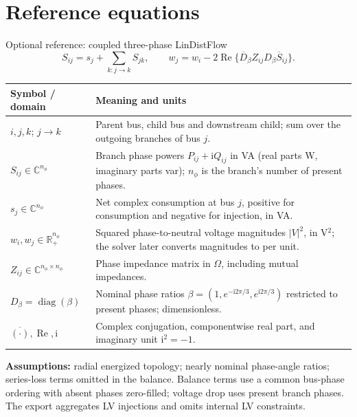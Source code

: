 \appendix
\section{Reference equations}
\begin{frame}[t]{Optional reference: coupled three-phase LinDistFlow}
\[
S_{ij}=s_j+\sum_{k:j\to k}S_{jk},\qquad
w_j=w_i-2\operatorname{Re}\{\overline D_\beta Z_{ij}D_\beta\overline S_{ij}\}.
\]
\begin{tabular}{@{}>{\raggedright\arraybackslash}p{.24\linewidth}>{\raggedright\arraybackslash}p{.69\linewidth}@{}}
\toprule Symbol / domain & Meaning and units \\
\midrule
$i,j,k$; $j\to k$ & Parent bus, child bus and downstream child; sum over the outgoing branches of bus $j$. \\
$S_{ij}\in\mathbb C^{n_\phi}$ & Branch phase powers $P_{ij}+\mathrm{i}Q_{ij}$ in VA (real parts W, imaginary parts var); $n_\phi$ is the branch's number of present phases. \\
$s_j\in\mathbb C^{n_\phi}$ & Net complex consumption at bus $j$, positive for consumption and negative for injection, in VA. \\
$w_i,w_j\in\mathbb R_+^{n_\phi}$ & Squared phase-to-neutral voltage magnitudes $|V|^2$, in V$^2$; the solver later converts magnitudes to per unit. \\
$Z_{ij}\in\mathbb C^{n_\phi\times n_\phi}$ & Phase impedance matrix in $\Omega$, including mutual impedances. \\
$D_\beta=\operatorname{diag}(\beta)$ & Nominal phase ratios $\beta=(1,e^{-\mathrm{i}2\pi/3},e^{\mathrm{i}2\pi/3})$ restricted to present phases; dimensionless. \\
$\overline{(\cdot)},\operatorname{Re},\mathrm{i}$ & Complex conjugation, componentwise real part, and imaginary unit $\mathrm{i}^2=-1$. \\
\bottomrule
\end{tabular}
\par\smallskip\textbf{Assumptions:} radial energized topology; nearly nominal phase-angle ratios; series-loss terms omitted in the balance. Balance terms use a common bus-phase ordering with absent phases zero-filled; voltage drop uses present branch phases. The export aggregates LV injections and omits internal LV constraints.
\end{frame}

